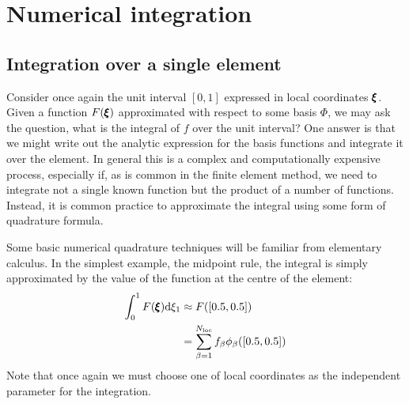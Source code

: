 \documentclass[a4paper, 11pt]{book}
\begin{document}
\section{Numerical integration}\label{sec:1dquadrature}

\subsection{Integration over a single element}

Consider once again the unit interval $[0,1]$ expressed in local coordinates
$\pmb{\xi}$. Given a function $F(\pmb{\xi})$ approximated with respect to some basis
$\Phi$, we may ask the question, what is the integral of $f$ over the unit
interval? One answer is that we might write out the analytic expression for
the basis functions and integrate it over the element. In general this is a
complex and computationally expensive process, especially if, as is common
in the finite element method, we need to integrate not a single known
function but the product of a number of functions. Instead, it is common
practice to approximate the integral using some form of quadrature formula.

Some basic numerical quadrature techniques will be familiar from elementary
calculus. In the simplest example, the midpoint rule, the integral is simply
approximated by the value of the function at the centre of the element:
\begin{equation}
  \begin{split}
    \int_{0}^1 F(\pmb{\xi})\mathrm{d}\xi_1&\approx F([0.5,0.5])\\
    &=\sum_{\beta=1}^{N_\mathrm{loc}} f_{\beta}\phi_{\beta}([0.5,0.5])
  \end{split}
\end{equation}
Note that once again we must choose one of local coordinates as the
independent parameter for the integration.
\end{document}

